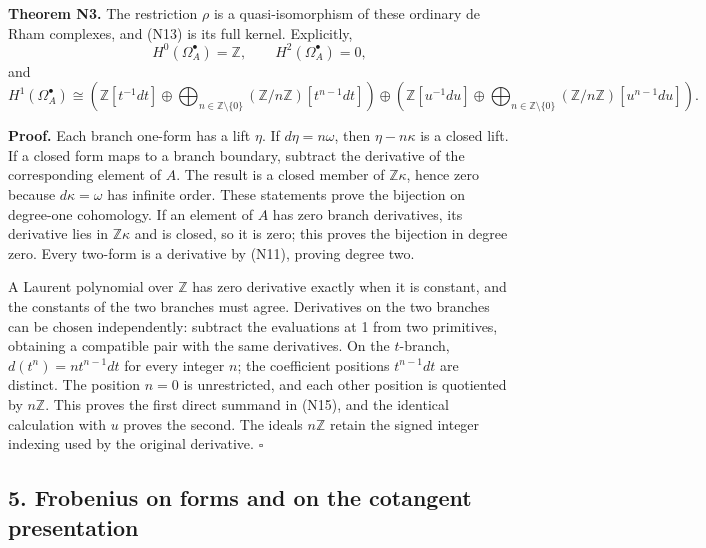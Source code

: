 \documentclass[
]{article}
\begin{document}
\textbf{Theorem N3.} The restriction \(\rho\) is a quasi-isomorphism of
these ordinary de Rham complexes, and (N13) is its full kernel.
Explicitly, \[
H^0(\Omega^\bullet_A)=\mathbb Z,\qquad H^2(\Omega^\bullet_A)=0,
\tag{N14}
\] and \[
H^1(\Omega^\bullet_A)\cong
\left(\mathbb Z[t^{-1}dt]\oplus
\bigoplus_{n\in\mathbb Z\setminus\{0\}}(\mathbb Z/n\mathbb Z)[t^{n-1}dt]\right)
\oplus
\left(\mathbb Z[u^{-1}du]\oplus
\bigoplus_{n\in\mathbb Z\setminus\{0\}}(\mathbb Z/n\mathbb Z)[u^{n-1}du]\right).
\tag{N15}
\]

\textbf{Proof.} Each branch one-form has a lift \(\eta\). If
\(d\eta=n\omega\), then \(\eta-n\kappa\) is a closed lift. If a closed
form maps to a branch boundary, subtract the derivative of the
corresponding element of \(A\). The result is a closed member of
\(\mathbb Z\kappa\), hence zero because \(d\kappa=\omega\) has infinite
order. These statements prove the bijection on degree-one cohomology. If
an element of \(A\) has zero branch derivatives, its derivative lies in
\(\mathbb Z\kappa\) and is closed, so it is zero; this proves the
bijection in degree zero. Every two-form is a derivative by (N11),
proving degree two.

A Laurent polynomial over \(\mathbb Z\) has zero derivative exactly when
it is constant, and the constants of the two branches must agree.
Derivatives on the two branches can be chosen independently: subtract
the evaluations at 1 from two primitives, obtaining a compatible pair
with the same derivatives. On the \(t\)-branch, \(d(t^n)=n t^{n-1}dt\)
for every integer \(n\); the coefficient positions \(t^{n-1}dt\) are
distinct. The position \(n=0\) is unrestricted, and each other position
is quotiented by \(n\mathbb Z\). This proves the first direct summand in
(N15), and the identical calculation with \(u\) proves the second. The
ideals \(n\mathbb Z\) retain the signed integer indexing used by the
original derivative. \(\square\)

\subsection{5. Frobenius on forms and on the cotangent
presentation}\label{frobenius-on-forms-and-on-the-cotangent-presentation}
\end{document}

